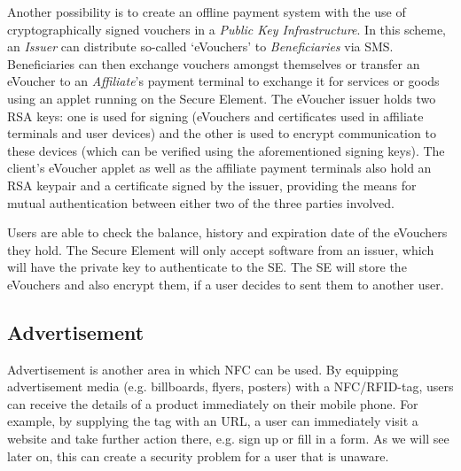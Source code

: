 Another possibility is to create an offline payment system with the use of cryptographically signed vouchers in a \textit{Public Key Infrastructure}. \cite{rivest1978method}
In this scheme, an \textit{Issuer} can distribute so-called `eVouchers' to \textit{Beneficiaries} via SMS.
Beneficiaries can then exchange vouchers amongst themselves or transfer an eVoucher to an \textit{Affiliate}'s payment terminal to exchange it for services or goods using an applet running on the Secure Element.
The eVoucher issuer holds two RSA keys: one is used for signing (eVouchers and certificates used in affiliate terminals and user devices) and the other is used to encrypt communication to these devices (which can be verified using the aforementioned signing keys).
The client's eVoucher applet as well as the affiliate payment terminals also hold an RSA keypair and a certificate signed by the issuer, providing the means for mutual authentication between either two of the three parties involved.

Users are able to check the balance, history and expiration date of the eVouchers they hold.
The Secure Element will only accept software from an issuer, which will have the private key to authenticate to the SE.
The SE will store the eVouchers and also encrypt them, if a user decides to sent them to another user. \cite{1592613}


\subsection{Advertisement}
Advertisement is another area in which NFC can be used. By equipping advertisement media (e.g. billboards, flyers, posters) with a NFC/RFID-tag, users can receive the details of a product immediately on their mobile phone.
For example, by supplying the tag with an URL, a user can immediately visit a website and take further action there, e.g. sign up or fill in a form.
As we will see later on, this can create a security problem for a user that is unaware. \cite{shannon2009profiling,mulliner2009vulnerability}

